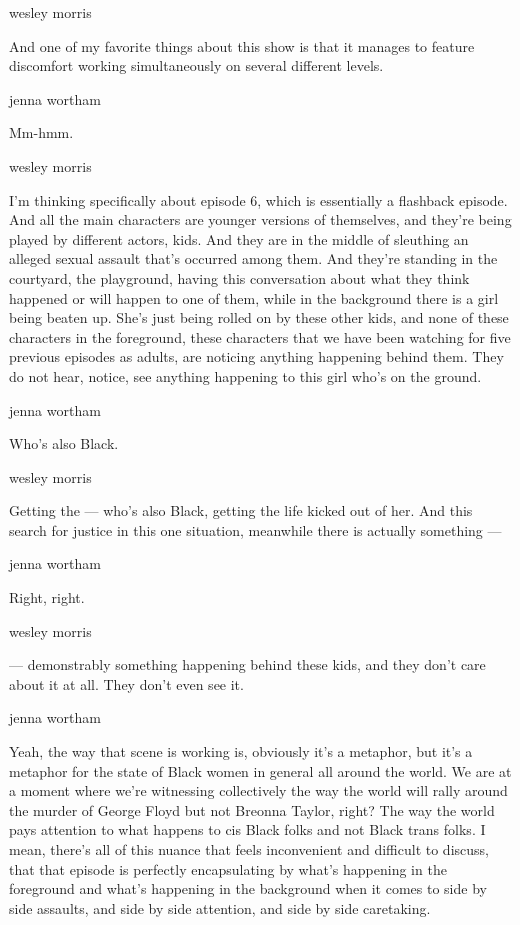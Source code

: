 wesley morris

And one of my favorite things about this show is that it manages to
feature discomfort working simultaneously on several different levels.

jenna wortham

Mm-hmm.

wesley morris

I'm thinking specifically about episode 6, which is essentially a
flashback episode. And all the main characters are younger versions of
themselves, and they're being played by different actors, kids. And they
are in the middle of sleuthing an alleged sexual assault that's occurred
among them. And they're standing in the courtyard, the playground,
having this conversation about what they think happened or will happen
to one of them, while in the background there is a girl being beaten up.
She's just being rolled on by these other kids, and none of these
characters in the foreground, these characters that we have been
watching for five previous episodes as adults, are noticing anything
happening behind them. They do not hear, notice, see anything happening
to this girl who's on the ground.

jenna wortham

Who's also Black.

wesley morris

Getting the --- who's also Black, getting the life kicked out of her.
And this search for justice in this one situation, meanwhile there is
actually something ---

jenna wortham

Right, right.

wesley morris

--- demonstrably something happening behind these kids, and they don't
care about it at all. They don't even see it.

jenna wortham

Yeah, the way that scene is working is, obviously it's a metaphor, but
it's a metaphor for the state of Black women in general all around the
world. We are at a moment where we're witnessing collectively the way
the world will rally around the murder of George Floyd but not Breonna
Taylor, right? The way the world pays attention to what happens to cis
Black folks and not Black trans folks. I mean, there's all of this
nuance that feels inconvenient and difficult to discuss, that that
episode is perfectly encapsulating by what's happening in the foreground
and what's happening in the background when it comes to side by side
assaults, and side by side attention, and side by side caretaking.

